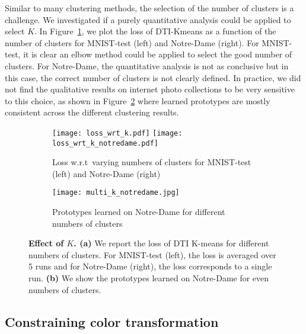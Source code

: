 \documentclass{article}
\begin{document}
Similar to many clustering methods, the selection of the number of clusters is a challenge.  
We investigated if a purely quantitative analysis could be applied to select $K$. In 
Figure~\ref{fig:loss_k_quant}, we plot the loss of DTI-Kmeans as a function of the number of 
clusters for MNIST-test (left) and Notre-Dame (right). For MNIST-test, it is clear an elbow 
method could be applied to select the good number of clusters. For Notre-Dame, the 
quantitative analysis is not as conclusive but in this case, the correct number of clusters 
is not clearly defined. In practice, we did not find the qualitative results on internet 
photo collections to be very sensitive to this choice, as shown in 
Figure~\ref{fig:loss_k_qual} where learned prototypes are mostly consistent across the 
different clustering results.
\begin{figure}[!h]
  \centering
  \begin{subfigure}{\columnwidth}
    \centering
    \texttt{[image: loss\_wrt\_k.pdf]}\quad
    \texttt{[image: loss\_wrt\_k\_notredame.pdf]}
    \caption{Loss w.r.t\ varying numbers of clusters for MNIST-test (left) and Notre-Dame 
    (right)}
    \label{fig:loss_k_quant}
  \end{subfigure}
  \begin{subfigure}{\columnwidth}
    \centering
    \vspace{0.1em}
    \texttt{[image: multi\_k\_notredame.jpg]}
    \caption{Prototypes learned on Notre-Dame for different numbers of clusters}
    \label{fig:loss_k_qual}
  \end{subfigure}

  \caption{\textbf{Effect of $K$. (a)} We report the loss of DTI K-means for different 
  numbers of clusters. For MNIST-test (left), the loss is averaged over 5 runs and for 
Notre-Dame (right), the loss corresponds to a single run. \textbf{(b)} We show the prototypes 
learned on Notre-Dame for even numbers of clusters.}
  \label{fig:loss_wrt_k}
\end{figure}

\subsection{Constraining color transformation}\label{sec:color_discuss}
\end{document}
